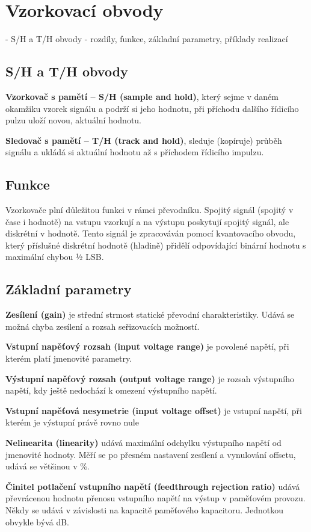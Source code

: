 \section{Vzorkovací obvody}
- S/H a T/H obvody - rozdíly, funkce, základní parametry, příklady realizací
\subsection{S/H a T/H obvody}
\textbf{Vzorkovač s pamětí – S/H (sample and hold)}, který sejme v daném okamžiku vzorek signálu a podrží si jeho hodnotu, při příchodu dalšího řídicího pulzu uloží novou, aktuální hodnotu.

\textbf{Sledovač s pamětí – T/H (track and hold)}, sleduje (kopíruje) průběh signálu a ukládá si aktuální hodnotu až s příchodem řídicího impulzu.

\subsection{Funkce}
Vzorkovače plní důležitou funkci v rámci převodníku. Spojitý signál (spojitý v čase i hodnotě) na vstupu vzorkují a na výstupu poskytují spojitý signál, ale diskrétní v hodnotě. Tento signál je zpracováván pomocí kvantovacího obvodu, který příslušné diskrétní hodnotě (hladině) přidělí odpovídající binární hodnotu s maximální chybou ½ LSB.
\subsection{Základní parametry}
\textbf{Zesílení (gain)} je střední strmost statické převodní charakteristiky. Udává se možná
chyba zesílení a rozsah seřizovacích možností.

\textbf{Vstupní napěťový rozsah (input voltage range)} je povolené napětí, při kterém platí
jmenovité parametry.

\textbf{Výstupní napěťový rozsah (output voltage range)} je rozsah výstupního napětí, kdy ještě
nedochází k omezení výstupního napětí.

\textbf{Vstupní napěťová nesymetrie (input voltage offset)} je vstupní napětí, při kterém je
výstupní právě rovno nule

\textbf{Nelinearita (linearity)} udává maximální odchylku výstupního napětí od jmenovité hodnoty. Měří se po přesném nastavení zesílení a vynulování offsetu, udává se většinou v \%.

\textbf{Činitel potlačení vstupního napětí (feedthrough rejection ratio)} udává převrácenou
hodnotu přenosu vstupního napětí na výstup v paměťovém provozu. Někdy se udává
v závislosti na kapacitě paměťového kapacitoru. Jednotkou obvykle bývá dB.

